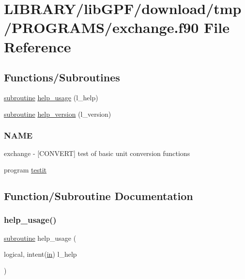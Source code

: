 \hypertarget{exchange_8f90}{}\section{L\+I\+B\+R\+A\+R\+Y/lib\+G\+P\+F/download/tmp/\+P\+R\+O\+G\+R\+A\+M\+S/exchange.f90 File Reference}
\label{exchange_8f90}
\subsection*{Functions/\+Subroutines}
\begin{DoxyCompactItemize}
\item 
\hyperlink{M__stopwatch_83_8txt_acfbcff50169d691ff02d4a123ed70482}{subroutine} \hyperlink{exchange_8f90_a3e09a3b52ee8fb04eeb93fe5761626a8}{help\+\_\+usage} (l\+\_\+help)
\item 
\hyperlink{M__stopwatch_83_8txt_acfbcff50169d691ff02d4a123ed70482}{subroutine} \hyperlink{exchange_8f90_a39c21619b08a3c22f19e2306efd7f766}{help\+\_\+version} (l\+\_\+version)
\begin{DoxyCompactList}\small\item\em \subsubsection*{N\+A\+ME}

exchange -\/ \mbox{[}C\+O\+N\+V\+E\+RT\mbox{]} test of basic unit conversion functions \end{DoxyCompactList}\item 
program \hyperlink{exchange_8f90_a483d2219923eccf493a883fceee5a424}{testit}
\end{DoxyCompactItemize}


\subsection{Function/\+Subroutine Documentation}
\mbox{\label{exchange_8f90_a3e09a3b52ee8fb04eeb93fe5761626a8}} 
\subsubsection{\texorpdfstring{help\+\_\+usage()}{help\_usage()}}
{\footnotesize\ttfamily \hyperlink{M__stopwatch_83_8txt_acfbcff50169d691ff02d4a123ed70482}{subroutine} help\+\_\+usage (\begin{DoxyParamCaption}\item[{logical, intent(\hyperlink{M__journal_83_8txt_afce72651d1eed785a2132bee863b2f38}{in})}]{l\+\_\+help }\end{DoxyParamCaption})}



